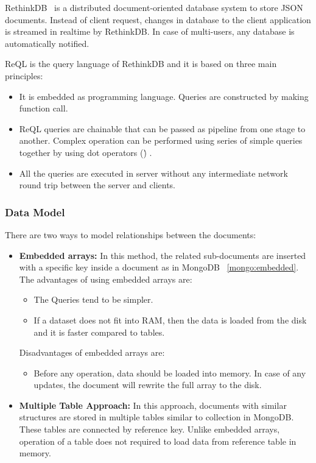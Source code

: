 RethinkDB~\citep{rethinkdb} is a distributed document-oriented database system to store JSON documents. Instead of client request,  changes in database to the client application is streamed in realtime by RethinkDB. In case of multi-users, any database is automatically  notified.
\par
ReQL is the query language  of RethinkDB and it is based on three main principles:
 \begin{itemize}
 \item  It is  embedded  as programming language. Queries are constructed by making function call. 
 \item ReQL queries are chainable that can be passed as pipeline from one stage to another. Complex operation can be performed using series of simple queries together by using dot operators (\.) . 
 \item All the queries are executed in server without any intermediate network round trip between the server and clients.
 \end{itemize}
  
\subsubsection{Data Model}
There are two ways to model relationships between the documents: 
\begin{itemize}
	\item \textbf{Embedded arrays:} In this method, the related sub-documents are inserted with a specific key inside a document as in MongoDB ~\ref{mongo:embedded}. The advantages of using embedded arrays are:
		\begin{itemize}
			\item The Queries tend to be simpler. 
			\item If a dataset  does not fit into RAM, then the data is loaded  from the disk and it is faster compared to tables. 
		\end{itemize}
		Disadvantages of embedded arrays are: 
		\begin{itemize}
			\item Before any operation, data should be loaded into memory. In case of any updates, the document will rewrite the full array to the disk.
		\end{itemize}
		
	\item 
	\textbf{Multiple Table Approach:} In this approach, documents with similar structures are stored in multiple tables similar to collection in MongoDB. These tables are connected by reference key. Unlike embedded arrays, operation of a table does not required to load data from reference table in memory.
\end{itemize}

